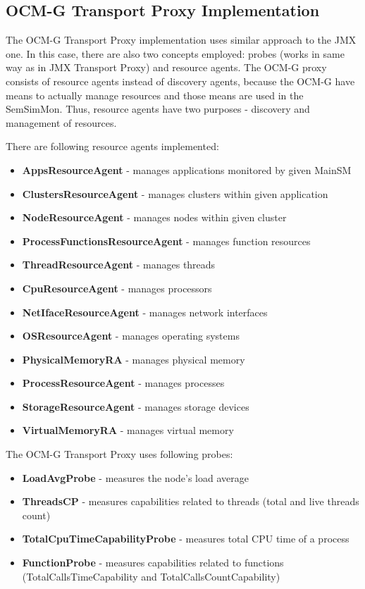 \subsection{OCM-G Transport Proxy Implementation}

The OCM-G Transport Proxy implementation uses similar approach to the JMX one. In this case, there are also two concepts employed: probes (works in same way as in JMX Transport Proxy) and resource agents. The OCM-G proxy consists of resource agents instead of discovery agents, because the OCM-G have means to actually manage resources and those means are used in the SemSimMon. Thus, resource agents have two purposes - discovery and management of resources.

There are following resource agents implemented:

\begin{itemize} 
  \item{\bf{AppsResourceAgent}} - manages applications monitored by given MainSM
  \item{\bf{ClustersResourceAgent}} - manages clusters within given application
  \item{\bf{NodeResourceAgent}} - manages nodes within given cluster
  \item{\bf{ProcessFunctionsResourceAgent}} - manages function resources
  \item{\bf{ThreadResourceAgent}} - manages threads
  \item{\bf{CpuResourceAgent}} - manages processors
  \item{\bf{NetIfaceResourceAgent}} - manages network interfaces
  \item{\bf{OSResourceAgent}} - manages operating systems
  \item{\bf{PhysicalMemoryRA}} - manages physical memory
  \item{\bf{ProcessResourceAgent}} - manages processes
  \item{\bf{StorageResourceAgent}} - manages storage devices
  \item{\bf{VirtualMemoryRA}} - manages virtual memory
 \end{itemize} 
  
The OCM-G Transport Proxy uses following probes:

\begin{itemize} 
  \item{\bf{LoadAvgProbe}} - measures the node\rq{}s load average 
  \item{\bf{ThreadsCP}} - measures capabilities related to threads (total and live threads count)
  \item{\bf{TotalCpuTimeCapabilityProbe}} - measures total CPU time of a process
  \item{\bf{FunctionProbe}} - measures capabilities related to functions (TotalCallsTimeCapability and TotalCallsCountCapability)
\end{itemize} 

